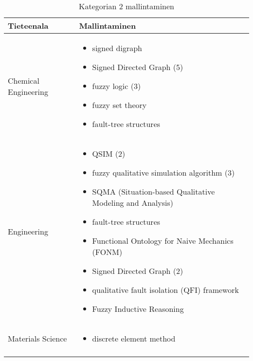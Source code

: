 \documentclass[utf8]{gradu3}
\begin{document}
\begin{longtable}[h]{|p{5cm}|p{8cm}|}
    \hline
    \textbf{Tieteenala}    &    \textbf{Mallintaminen}\\
    \hline
    Chemical Engineering & \begin{itemize}
        \item signed digraph
        \item Signed Directed Graph (5)
        \item fuzzy logic (3)
        \item fuzzy set theory
        \item fault-tree structures
    \end{itemize} \\
    \hline
    Engineering & \begin{itemize}
        \item QSIM (2)
        \item fuzzy qualitative simulation algorithm (3)
        \item SQMA (Situation-based Qualitative Modeling and Analysis)
        \item fault-tree structures
        \item Functional Ontology for Naive Mechanics (FONM)
        \item Signed Directed Graph (2)
        \item qualitative fault isolation (QFI) framework
        \item Fuzzy Inductive Reasoning
    \end{itemize} \\
    \hline
    Materials Science & \begin{itemize}
        \item discrete element method
    \end{itemize} \\
    \hline
    \caption{Kategorian 2 mallintaminen}
    \label{table:Kategorian 2 mallintaminen}
\end{longtable}
\end{document}
